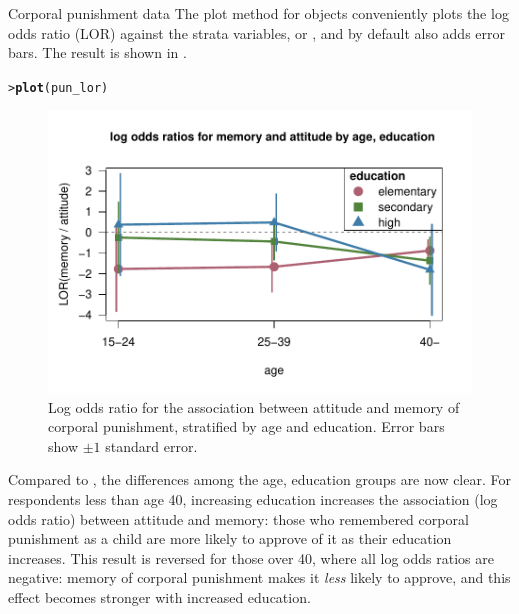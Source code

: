 \documentclass[10pt,krantz2]{krantz}\usepackage[]{graphicx}\usepackage[]{color}
\makeatletter
\newcommand{\hlstd}[1]{\textcolor[rgb]{0.345,0.345,0.345}{#1}}%
\newcommand{\hlkwd}[1]{\textcolor[rgb]{0.737,0.353,0.396}{\textbf{#1}}}%
\newenvironment{kframe}{%
 \def\at@end@of@kframe{}%
 \ifinner\ifhmode%
  \def\at@end@of@kframe{\end{minipage}}%
  \begin{minipage}{\columnwidth}%
 \fi\fi%
 \def\FrameCommand##1{\hskip\@totalleftmargin \hskip-\fboxsep
 \colorbox{shadecolor}{##1}\hskip-\fboxsep
     \hskip-\linewidth \hskip-\@totalleftmargin \hskip\columnwidth}%
 \MakeFramed {\advance\hsize-\width
   \@totalleftmargin\z@ \linewidth\hsize
   \@setminipage}}%
 {\par\unskip\endMakeFramed%
 \at@end@of@kframe}
\newenvironment{knitrout}{}{} %
\renewenvironment{knitrout}{\small\renewcommand{\baselinestretch}{.85}}{} %
\makeatother
\begin{document}
\begin{Example}[punish2]{Corporal punishment data}
The plot method for  objects conveniently plots the log odds ratio (LOR) 
against the strata variables,  or , and by
default also adds error bars. The result is shown in .
\begin{knitrout}
\color{fgcolor}\begin{kframe}
\begin{alltt}
\hlstd{> }\hlkwd{plot}\hlstd{(pun_lor)}
\end{alltt}
\end{kframe}\begin{figure}[!htbp]

\centerline{\includegraphics[width=.8\textwidth]{ch05/fig/pun-lor-plot-1} }

\caption[Log odds ratio for the association between attitude and memory of corporal punishment, stratified by age and education]{Log odds ratio for the association between attitude and memory of corporal punishment, stratified by age and education. Error bars show $\pm 1$ standard error.\label{fig:pun-lor-plot}}
\end{figure}


\end{knitrout}
Compared to , the differences among the age, education groups are now clear.
For respondents less than age 40, increasing education increases the association (log odds ratio) 
between attitude and memory: those who remembered corporal punishment as a child are more likely to
approve of it as their education increases.  This result is reversed for those over 40, where all
log odds ratios are negative: memory of corporal punishment makes it \emph{less} likely to approve,
and this effect becomes stronger with increased education.


\end{Example}
\end{document}

